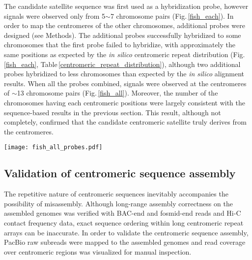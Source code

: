   The candidate satellite sequence was first used as a hybridization probe, however signals were observed only from 5$\sim$7 chromosome pairs (Fig.\,\ref{fish_each}). In order to map the centromeres of the other chromosomes, additional probes were designed (see Methods). The additional probes successfully hybridized to some chromosomes that the first probe failed to hybridize, with approximately the same positions as expected by the \textit{in silico} centromeric repeat distribution (Fig.\,\ref{fish_each}, Table\,\ref{centromeric_repeat_distribution}), although two additional probes hybridized to less chromosomes than expected by the \textit{in silico} alignment results. When all the probes combined, signals were observed at the centromeres of $\sim$13 chromosome pairs (Fig.\,\ref{fish_all}). Moreover, the number of the chromosomes having each centromeric positions were largely consistent with the sequence-based results in the previous section. This result, although not completely, confirmed that the candidate centromeric satellite truly derives from the centromeres.

  \begin{figure*}
    \centering
    \texttt{[image: fish\_all\_probes.pdf]}
    \caption{
      FISH mapping of the centromeres. The probes designed by the candidate centromeric satellite sequence and three derivative sequences localized to the centromeres of $\sim$13 chromosomes pairs in total. (left) DNA is stained blue with DAPI. (center) probes are stained green. (right) two images are combined.
    }
    \label{fish_all}
  \end{figure*}


\subsection*{Validation of centromeric sequence assembly}
  The repetitive nature of centromeric sequences inevitably accompanies the possibility of misassembly. Although long-range assembly correctness on the assembled genomes was verified with BAC-end and fosmid-end reads and Hi-C contact frequency data, exact sequence ordering within long centromeric repeat arrays can be inaccurate. In order to validate the centromeric sequence assembly, PacBio raw subreads were mapped to the assembled genomes and read coverage over centromeric regions was visualized for manual inspection.

